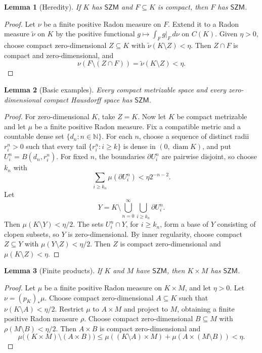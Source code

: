 \documentclass[11pt]{article}
\newtheorem{lemma}{Lemma}
\begin{document}
\begin{lemma}[Heredity]
If \(K\) has \(\mathsf{SZM}\) and \(F\subseteq K\) is compact, then \(F\) has \(\mathsf{SZM}\).
\end{lemma}

\begin{proof}
Let \(\nu\) be a finite positive Radon measure on \(F\).  Extend it to a Radon measure \(\tilde\nu\) on \(K\) by the positive functional \(g\mapsto \int_F g|_F\,d\nu\) on \(C(K)\).  Given \(\eta>0\), choose compact zero-dimensional \(Z\subseteq K\) with \(\tilde\nu(K\setminus Z)<\eta\).  Then \(Z\cap F\) is compact and zero-dimensional, and
\[
  \nu(F\setminus (Z\cap F))=\tilde\nu(K\setminus Z)<\eta .
\]
\end{proof}

\begin{lemma}[Basic examples]
Every compact metrizable space and every zero-dimensional compact Hausdorff space has \(\mathsf{SZM}\).
\end{lemma}

\begin{proof}
For zero-dimensional \(K\), take \(Z=K\).  Now let \(K\) be compact metrizable and let \(\mu\) be a finite positive Radon measure.  Fix a compatible metric and a countable dense set \(\{d_n:n\in\mathbb N\}\).  For each \(n\), choose a sequence of distinct radii \(r_i^n>0\) such that every tail \(\{r_i^n:i\ge k\}\) is dense in \((0,\operatorname{diam} K)\), and put \(U_i^n=B(d_n,r_i^n)\).  For fixed \(n\), the boundaries \(\partial U_i^n\) are pairwise disjoint, so choose \(k_n\) with
\[
 \sum_{i\ge k_n}\mu(\partial U_i^n)<\eta 2^{-n-2}.
\]
Let
\[
Y=K\setminus \bigcup_{n=0}^\infty\bigcup_{i\ge k_n}\partial U_i^n .
\]
Then \(\mu(K\setminus Y)<\eta/2\).  The sets \(U_i^n\cap Y\), for \(i\ge k_n\), form a base of \(Y\) consisting of clopen subsets, so \(Y\) is zero-dimensional.  By inner regularity, choose compact \(Z\subseteq Y\) with \(\mu(Y\setminus Z)<\eta/2\).  Then \(Z\) is compact zero-dimensional and \(\mu(K\setminus Z)<\eta\).
\end{proof}

\begin{lemma}[Finite products]
If \(K\) and \(M\) have \(\mathsf{SZM}\), then \(K\times M\) has \(\mathsf{SZM}\).
\end{lemma}

\begin{proof}
Let \(\mu\) be a finite positive Radon measure on \(K\times M\), and let \(\eta>0\).  Let \(\nu=(p_K)_*\mu\).  Choose compact zero-dimensional \(A\subseteq K\) such that \(\nu(K\setminus A)<\eta/2\).  Restrict \(\mu\) to \(A\times M\) and project to \(M\), obtaining a finite positive Radon measure \(\rho\).  Choose compact zero-dimensional \(B\subseteq M\) with \(\rho(M\setminus B)<\eta/2\).  Then \(A\times B\) is compact zero-dimensional and
\[
\mu\big((K\times M)\setminus(A\times B)\big)
\le \mu((K\setminus A)\times M)+\mu(A\times(M\setminus B))<\eta .
\]
\end{proof}
\end{document}
